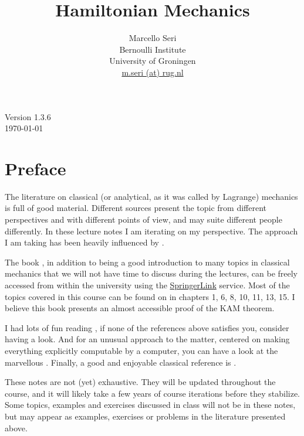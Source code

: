 \documentclass[english,fontsize=11pt,paper=a5,oneside]{scrbook}
\title{Hamiltonian Mechanics}
\author{Marcello Seri\\
\small{Bernoulli Institute}\vspace{-.2cm}\\
\small{University of Groningen}\vspace{-.2cm}\\
\small\href{mailto:m.seri@rug.nl}{m.seri (at) rug.nl}
}
\date{}
\theoremstyle{definition}
\def\biblio{}
\begin{document}
\def\biblio{}

\maketitle

\cleardoublepage

\thispagestyle{empty}
\null\vfill
\begin{center}
    Version 1.3.6\\
    \today
\end{center}
\vfill
\small{\doclicenseThis}

\cleardoublepage

\tableofcontents

\cleardoublepage

\chapter*{Preface}

The literature on classical (or analytical, as it was called by Lagrange) mechanics is full of good material.
Different sources present the topic from different perspectives and with different points of view, and may suite different people differently.
In these lecture notes I am iterating on my perspective.
The approach I am taking has been heavily influenced by \cite{book:arnold, book:knauf,lectures:dubrovin, book:lowenstein, book:marsdenratiu, lectures:tong,landau1976mechanics}.

The book \cite{book:knauf}, in addition to being a good introduction to many topics in classical mechanics that we will not have time to discuss during the lectures, can be freely accessed from within the university using the \href{https://link.springer.com/book/10.1007%2F978-3-662-55774-7}{SpringerLink} service.
Most of the topics covered in this course can be found on \cite{book:knauf} in chapters 1, 6, 8, 10, 11, 13, 15. I believe this book presents an almost accessible proof of the KAM theorem.

I had lots of fun reading \cite{schwichtenberg2019no}, if none of the references above satisfies you, consider having a look. And for an unusual approach to the matter, centered on making everything explicitly computable by a computer, you can have a look at the marvellous \cite{book:sicm}. Finally, a good and enjoyable classical reference is \cite{goldstein2013classical}.

These notes are not (yet) exhaustive.
They will be updated throughout the course, and it will likely take a few years of course iterations before they stabilize.
Some topics, examples and exercises discussed in class will not be in these notes, but may appear as examples, exercises or problems in the literature presented above.
\end{document}
